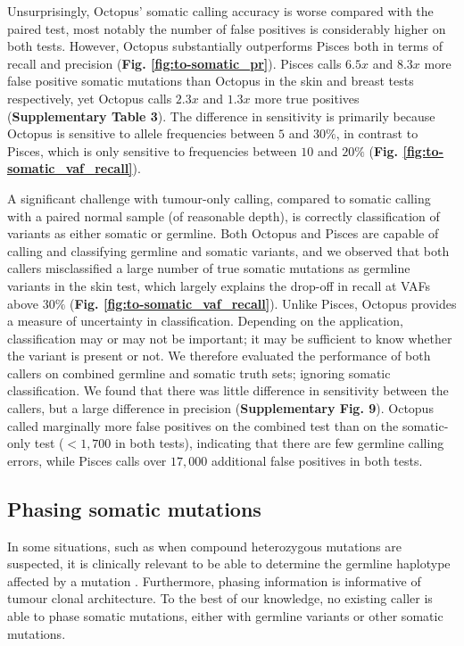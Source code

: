 \documentclass[notitlepage, twocolumn, 10pt]{article}
\begin{document}
Unsurprisingly, Octopus' somatic calling accuracy is worse compared with the paired test, most notably the number of false positives is considerably higher on both tests. However, Octopus substantially outperforms Pisces both in terms of recall and precision (\textbf{Fig. \ref{fig:to-somatic_pr}}). Pisces calls $6.5x$ and $8.3x$ more false positive somatic mutations than Octopus in the skin and breast tests respectively, yet Octopus calls $2.3x$ and $1.3x$ more true positives (\textbf{Supplementary Table 3}). The difference in sensitivity is primarily because Octopus is sensitive to allele frequencies between $5$ and $30\%$, in contrast to Pisces, which is only sensitive to frequencies between $10$ and $20\%$ (\textbf{Fig. \ref{fig:to-somatic_vaf_recall}}).

A significant challenge with tumour-only calling, compared to somatic calling with a paired normal sample (of reasonable depth), is correctly classification of variants as either somatic or germline. Both Octopus and Pisces are capable of calling and classifying germline and somatic variants, and we observed that both callers misclassified a large number of true somatic mutations as germline variants in the skin test, which largely explains the drop-off in recall at VAFs above $30\%$ (\textbf{Fig. \ref{fig:to-somatic_vaf_recall}}). Unlike Pisces, Octopus provides a measure of uncertainty in classification. Depending on the application, classification may or may not be important; it may be sufficient to know whether the variant is present or not. We therefore evaluated the performance of both callers on combined germline and somatic truth sets; ignoring somatic classification. We found that there was little difference in sensitivity between the callers, but a large difference in precision (\textbf{Supplementary Fig. 9}). Octopus called marginally more false positives on the combined test than on the somatic-only test ($<1,700$ in both tests), indicating that there are few germline calling errors, while Pisces calls over $17,000$ additional false positives in both tests.

\subsection*{Phasing somatic mutations}

In some situations, such as when compound heterozygous mutations are suspected, it is clinically relevant to be able to determine the germline haplotype affected by a mutation \cite{RN623}. Furthermore, phasing information is informative of tumour clonal architecture. To the best of our knowledge, no existing caller is able to phase somatic mutations, either with germline variants or other somatic mutations.
\end{document}
